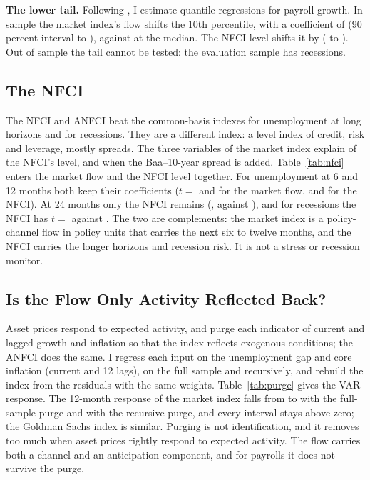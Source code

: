\documentclass[11pt]{article}
\begin{document}
\begin{appendices}


\textbf{The lower tail.} Following \citet{adrian2019}, I estimate quantile regressions for payroll growth. In sample the market index's flow shifts the 10th percentile, with a coefficient of  (90 percent interval  to ), against  at the median. The NFCI level shifts it by  ( to ). Out of sample the tail cannot be tested: the evaluation sample has  recessions.

\subsection{The NFCI}\label{sec:nfci}
The NFCI and ANFCI beat the common-basis indexes for unemployment at long horizons and for recessions. They are a different index: a level index of credit, risk and leverage, mostly spreads. The three variables of the market index explain  of the NFCI's level, and  when the Baa--10-year spread is added. Table~\ref{tab:nfci} enters the market flow and the NFCI level together. For unemployment at 6 and 12 months both keep their coefficients ($t=$  and  for the market flow,  and  for the NFCI). At 24 months only the NFCI remains (, against ), and for recessions the NFCI has $t=$  against . The two are complements: the market index is a policy-channel flow in policy units that carries the next six to twelve months, and the NFCI carries the longer horizons and recession risk. It is not a stress or recession monitor.



\subsection{Is the Flow Only Activity Reflected Back?}\label{sec:purge}
Asset prices respond to expected activity, and \citet{hatzius2010} purge each indicator of current and lagged growth and inflation so that the index reflects exogenous conditions; the ANFCI does the same. I regress each input on the unemployment gap and core inflation (current and 12 lags), on the full sample and recursively, and rebuild the index from the residuals with the same weights. Table~\ref{tab:purge} gives the VAR response. The 12-month response of the market index falls from  to  with the full-sample purge and  with the recursive purge, and every interval stays above zero; the Goldman Sachs index is similar. Purging is not identification, and it removes too much when asset prices rightly respond to expected activity. The flow carries both a channel and an anticipation component, and for payrolls it does not survive the purge.


\end{appendices}
\end{document}
